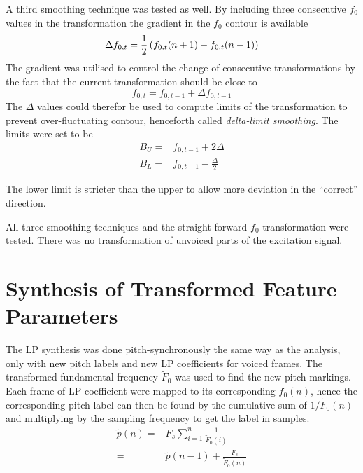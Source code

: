 A third smoothing technique was tested as well. By including three consecutive $f_0$ values in the transformation the gradient in the $f_0$ contour is available
\begin{equation}
	\Delta f_{0,t} = \frac{1}{2}\left(f_{0,t}(n+1)-f_{0,t}(n-1)\right)
\end{equation}
The gradient was utilised to control the change of consecutive transformations by the fact that the current transformation should be close to
\begin{equation}
	f_{0,t} = f_{0,t-1} + \Delta f_{0,t-1}
\end{equation}
The $\Delta$ values could therefor be used to compute limits of the transformation to prevent over-fluctuating contour, henceforth called \emph{delta-limit smoothing}. The limits were set to be
\begin{equation}
	\begin{split}
		B_U = & f_{0,t-1} + 2\Delta\\
		B_L = & f_{0,t-1} - \frac{\Delta}{2}
	\end{split}
\end{equation} 
\begin{remark}
	The lower limit is stricter than the upper to allow more deviation in the ``correct'' direction.
\end{remark}

All three smoothing techniques and the straight forward $f_0$ transformation were tested. There was no transformation of unvoiced parts of the excitation signal. 


\section{Synthesis of Transformed Feature Parameters} %
\label{sec:synthesis_of_transformed_feature_parameters}

The LP synthesis was done pitch-synchronously the same way as the analysis, only with new pitch labels and new LP coefficients for voiced frames. The transformed fundamental frequency $\tilde{F}_0$ was used to find the new pitch markings. Each frame of LP coefficient were mapped to its corresponding $f_0(n)$, hence the corresponding pitch label can then be found by the cumulative sum of $1/\tilde{F}_0(n)$ and multiplying by the sampling frequency to get the label in samples.
\begin{equation}
	\begin{split}
		\tilde{p}(n) =& F_s \sum_{i=1}^{n}\frac{1}{\tilde{F}_0(i)} \\
		 =& \tilde{p}(n-1) + \frac{F_s}{\tilde{F}_0(n)} \\
	\end{split}
\end{equation}

